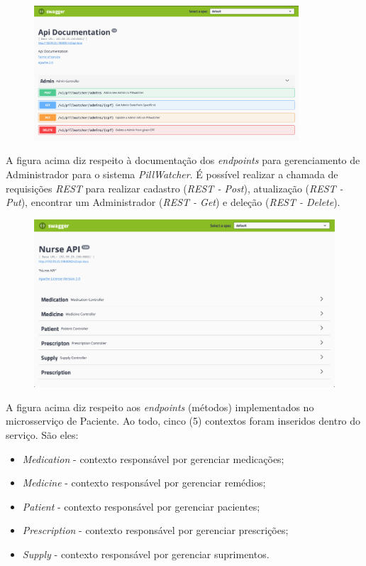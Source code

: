 \begin{apendicesenv}
\begin{figure}[H]
    \centering
    \includegraphics[width=0.88\textwidth,page=1]{figuras/software/SwaggerUi/SwaggerUi_Admin.png}
    \label{fig:swagger_admin}
\end{figure}

A figura acima diz respeito à documentação dos \textit{endpoints} para gerenciamento de Administrador para o sistema \textit{PillWatcher}. É possível realizar a chamada de requisições \textit{REST} para realizar cadastro (\textit{REST - Post}), atualização (\textit{REST - Put}), encontrar um Administrador (\textit{REST - Get}) e deleção (\textit{REST - Delete}).

\begin{figure}[H]
    \centering
    \includegraphics[width=1.0\textwidth,page=1]{figuras/software/SwaggerUi/SwaggerUI_NursingMs.png}
    \label{fig:nursing_png}
\end{figure}

A figura acima diz respeito aos \textit{endpoints} (métodos) implementados no microsserviço de Paciente. Ao todo, cinco (5) contextos foram inseridos dentro do serviço. São eles:

\begin{itemize}
    \item \textit{Medication} - contexto responsável por gerenciar medicações;
    \item \textit{Medicine} - contexto responsável por gerenciar remédios;
    \item \textit{Patient} - contexto responsável por gerenciar pacientes;
    \item \textit{Prescription} - contexto responsável por gerenciar prescrições;
    \item \textit{Supply} - contexto responsável por gerenciar suprimentos. 
\end{itemize}


\end{apendicesenv}
